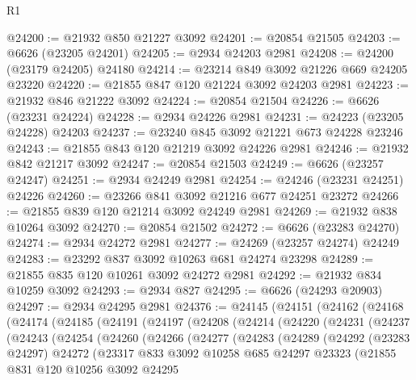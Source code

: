 \begin{lexlean}{R1}
\begin{coremodule}
@24200 := @21932 @850 @21227 @3092
@24201 := @20854 @21505
@24203 := @6626 (@23205 @24201)
@24205 := @2934 @24203 @2981
@24208 := @24200 (@23179 @24205) @24180
@24214 := @23214 @849 @3092 @21226 @669 @24205 @23220
@24220 := @21855 @847 @120 @21224 @3092 @24203 @2981
@24223 := @21932 @846 @21222 @3092
@24224 := @20854 @21504
@24226 := @6626 (@23231 @24224)
@24228 := @2934 @24226 @2981
@24231 := @24223 (@23205 @24228) @24203
@24237 := @23240 @845 @3092 @21221 @673 @24228 @23246
@24243 := @21855 @843 @120 @21219 @3092 @24226 @2981
@24246 := @21932 @842 @21217 @3092
@24247 := @20854 @21503
@24249 := @6626 (@23257 @24247)
@24251 := @2934 @24249 @2981
@24254 := @24246 (@23231 @24251) @24226
@24260 := @23266 @841 @3092 @21216 @677 @24251 @23272
@24266 := @21855 @839 @120 @21214 @3092 @24249 @2981
@24269 := @21932 @838 @10264 @3092
@24270 := @20854 @21502
@24272 := @6626 (@23283 @24270)
@24274 := @2934 @24272 @2981
@24277 := @24269 (@23257 @24274) @24249
@24283 := @23292 @837 @3092 @10263 @681 @24274 @23298
@24289 := @21855 @835 @120 @10261 @3092 @24272 @2981
@24292 := @21932 @834 @10259 @3092
@24293 := @2934 @827
@24295 := @6626 (@24293 @20903)
@24297 := @2934 @24295 @2981
@24376 := @24145
    (@24151
      (@24162
        (@24168
          (@24174
            (@24185
              (@24191
                (@24197
                  (@24208
                    (@24214
                      (@24220
                        (@24231
                          (@24237
                            (@24243
                              (@24254
                                (@24260
                                  (@24266
                                    (@24277
                                      (@24283
                                        (@24289
                                          (@24292
                                            (@23283 @24297)
                                            @24272
                                            (@23317
                                              @833
                                              @3092
                                              @10258
                                              @685
                                              @24297
                                              @23323
                                              (@21855
                                                @831
                                                @120
                                                @10256
                                                @3092
                                                @24295

\end{coremodule}
\end{lexlean}
